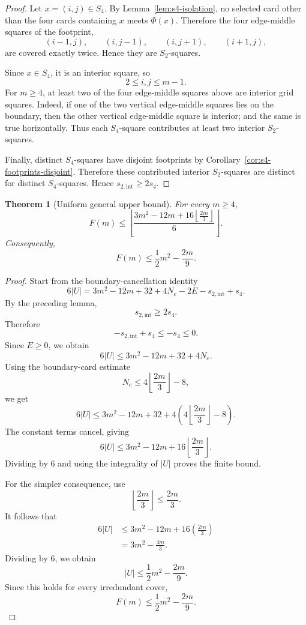 \documentclass[11pt]{article}
\newtheorem{theorem}{Theorem}[section]
\begin{document}
	\begin{proof}
		Let \(x=(i,j)\in S_4\).  By Lemma~\ref{lem:s4-isolation}, no selected card
		other than the four cards containing \(x\) meets \(\Phi(x)\).  Therefore the four edge-middle
		squares of the footprint,
		\[
		(i-1,j),\qquad (i,j-1),\qquad (i,j+1),\qquad (i+1,j),
		\]
		are covered exactly twice.  Hence they are \(S_2\)-squares.
		
		Since \(x\in S_4\), it is an interior square, so
		\[
		2\le i,j\le m-1.
		\]
		For \(m\ge4\), at least two of the four edge-middle squares above are interior
		grid squares.  Indeed, if one of the two vertical edge-middle squares lies on
		the boundary, then the other vertical edge-middle square is interior; and the
		same is true horizontally.  Thus each \(S_4\)-square contributes at least two
		interior \(S_2\)-squares.
		
		Finally, distinct \(S_4\)-squares have disjoint footprints by
		Corollary~\ref{cor:s4-footprints-disjoint}.  Therefore these contributed
		interior \(S_2\)-squares are distinct for distinct \(S_4\)-squares.  Hence
		$s_{2,\mathrm{int}}\ge 2s_4.$
	\end{proof}
	
	\begin{theorem}[Uniform general upper bound]
		For every \(m\ge4\),
		\[
		{
			F(m)
			\le
			\left\lfloor
			\frac{
				3m^2-12m
				+
				16\left\lfloor\frac{2m}{3}\right\rfloor
			}{6}
			\right\rfloor.
		}
		\]
		Consequently,
		\[
		F(m)\le\frac12m^2-\frac{2m}{9}.
		\]
	\end{theorem}
	
	\begin{proof}
		Start from the boundary-cancellation identity
		\[
		6|U|
		=
		3m^2-12m+32+4N_e-2E-s_{2,\mathrm{int}}+s_4.
		\]
		By the preceding lemma,
		\[
		s_{2,\mathrm{int}}\ge 2s_4.
		\]
		Therefore
		\[
		-s_{2,\mathrm{int}}+s_4\le -s_4\le0.
		\]
		Since \(E\ge0\), we obtain
		\[
		6|U|
		\le
		3m^2-12m+32+4N_e.
		\]
		Using the boundary-card estimate
		\[
		N_e\le4\left\lfloor\frac{2m}{3}\right\rfloor-8,
		\]
		we get
		\[
		6|U|
		\le
		3m^2-12m+32
		+
		4\left(
		4\left\lfloor\frac{2m}{3}\right\rfloor-8
		\right).
		\]
		The constant terms cancel, giving
		\[
		6|U|
		\le
		3m^2-12m
		+
		16\left\lfloor\frac{2m}{3}\right\rfloor.
		\]
		Dividing by \(6\) and using the integrality of \(|U|\) proves the finite bound.
		
		For the simpler consequence, use
		\[
		\left\lfloor\frac{2m}{3}\right\rfloor
		\le
		\frac{2m}{3}.
		\]
		It follows that
		\[
		\begin{aligned}
			6|U|
			&\le
			3m^2-12m
			+
			16\left(\frac{2m}{3}\right)\\
			&=
			3m^2-\frac{4m}{3}.
		\end{aligned}
		\]
		Dividing by \(6\), we obtain
		\[
		|U|\le\frac12m^2-\frac{2m}{9}.
		\]
		Since this holds for every irredundant cover,
		\[
		F(m)\le\frac12m^2-\frac{2m}{9}.
		\]
	\end{proof}
	
\end{document}
